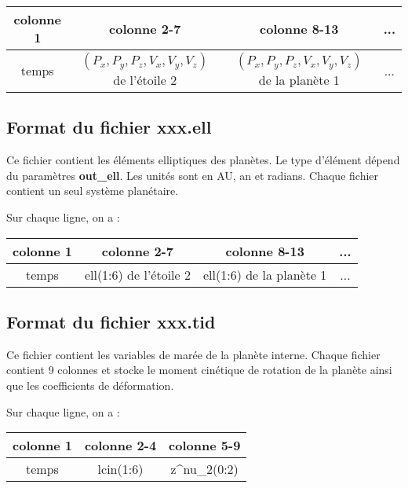 \documentclass[11pt]{article}
\begin{document}
\begin{tabular}{|c|c|c|c|} \hline
colonne 1 &   colonne 2-7 & colonne 8-13 & ... \\ \hline
temps & $(P_x,P_y,P_z,V_x,V_y,V_z)$ de l'\'etoile 2  & $(P_x,P_y,P_z,V_x,V_y,V_z)$ de la plan\`ete 1 & ... \\    \hline
\end{tabular}


\subsection{Format du fichier {\bf xxx.ell} }

Ce fichier contient les \'el\'ements elliptiques des plan\`etes. 
Le type d'\'el\'ement d\'epend du param\`etres  {\bf out\_ell}. Les unit\'es sont en AU, an et radians.
Chaque fichier contient un seul syst\`eme plan\'etaire.

Sur chaque ligne, on a : 

\begin{tabular}{|c|c|c|c|} \hline
colonne 1 &   colonne 2-7 & colonne 8-13 & ... \\ \hline
temps & ell(1:6) de l'\'etoile 2  & ell(1:6) de la plan\`ete 1 & ... \\    \hline
\end{tabular}


\subsection{Format du fichier {\bf xxx.tid} }

Ce fichier contient les variables de mar\'ee de la plan\`ete interne.
Chaque fichier contient 9 colonnes et stocke le moment cin\'etique de
rotation de la plan\`ete ainsi que les coefficients de d\'eformation.

Sur chaque ligne, on a : 

\begin{tabular}{|c|c|c|} \hline
colonne 1 &   colonne 2-4 & colonne 5-9 \\ \hline
temps & lcin(1:6) & z\^{}nu\_2(0:2) \\    \hline
\end{tabular}
\end{document}
